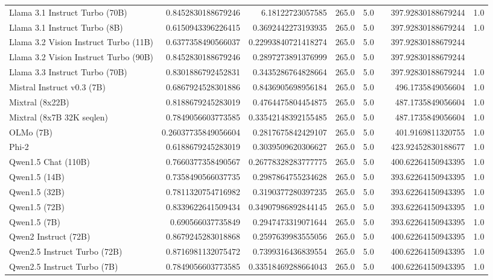 \begin{table}[htp]
{\begin{tabular}{lrrrrrrr}
Llama 3.1 Instruct Turbo (70B) & 0.8452830188679246 & 6.18122723057585 & 265.0 & 5.0 &  & 397.92830188679244 & 1.0 \\
Llama 3.1 Instruct Turbo (8B) & 0.6150943396226415 & 0.3692442273193935 & 265.0 & 5.0 &  & 397.92830188679244 & 1.0 \\
Llama 3.2 Vision Instruct Turbo (11B) & 0.6377358490566037 & 0.22993840721418274 & 265.0 & 5.0 &  & 397.92830188679244 &  \\
Llama 3.2 Vision Instruct Turbo (90B) & 0.8452830188679246 & 0.2897273891376999 & 265.0 & 5.0 &  & 397.92830188679244 &  \\
Llama 3.3 Instruct Turbo (70B) & 0.8301886792452831 & 0.3435286764828664 & 265.0 & 5.0 &  & 397.92830188679244 & 1.0 \\
Mistral Instruct v0.3 (7B) & 0.6867924528301886 & 0.8436905698956184 & 265.0 & 5.0 &  & 496.1735849056604 & 1.0 \\
Mixtral (8x22B) & 0.8188679245283019 & 0.4764475804454875 & 265.0 & 5.0 &  & 487.1735849056604 & 1.0 \\
Mixtral (8x7B 32K seqlen) & 0.7849056603773585 & 0.33542148392155485 & 265.0 & 5.0 &  & 487.1735849056604 & 1.0 \\
OLMo (7B) & 0.26037735849056604 & 0.2817675842429107 & 265.0 & 5.0 &  & 401.9169811320755 & 1.0 \\
Phi-2 & 0.6188679245283019 & 0.3039509620306627 & 265.0 & 5.0 &  & 423.92452830188677 & 1.0 \\
Qwen1.5 Chat (110B) & 0.7660377358490567 & 0.26778328283777775 & 265.0 & 5.0 &  & 400.62264150943395 & 1.0 \\
Qwen1.5 (14B) & 0.7358490566037735 & 0.2987864755234628 & 265.0 & 5.0 &  & 393.62264150943395 & 1.0 \\
Qwen1.5 (32B) & 0.7811320754716982 & 0.3190377280397235 & 265.0 & 5.0 &  & 393.62264150943395 & 1.0 \\
Qwen1.5 (72B) & 0.8339622641509434 & 0.34907986892844145 & 265.0 & 5.0 &  & 393.62264150943395 & 1.0 \\
Qwen1.5 (7B) & 0.690566037735849 & 0.2947473319071644 & 265.0 & 5.0 &  & 393.62264150943395 & 1.0 \\
Qwen2 Instruct (72B) & 0.8679245283018868 & 0.2597639983555056 & 265.0 & 5.0 &  & 400.62264150943395 & 1.0 \\
Qwen2.5 Instruct Turbo (72B) & 0.8716981132075472 & 0.7399316436839554 & 265.0 & 5.0 &  & 400.62264150943395 & 1.0 \\
Qwen2.5 Instruct Turbo (7B) & 0.7849056603773585 & 0.33518469288664043 & 265.0 & 5.0 &  & 400.62264150943395 & 1.0 \\

\end{tabular}}
\end{table}
